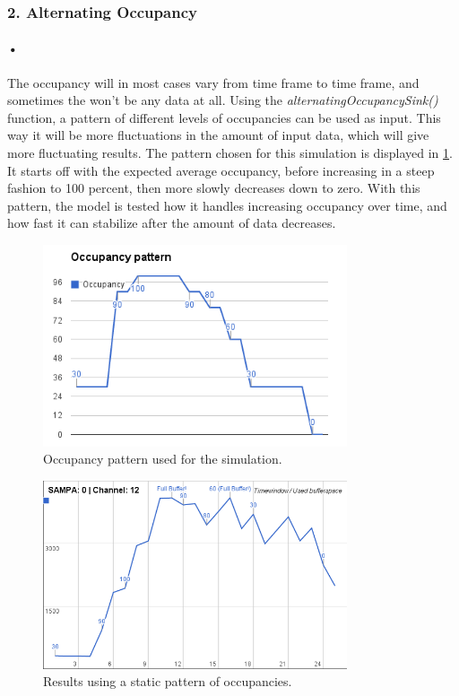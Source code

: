 \documentclass[a4paper, 12pt]{report}\dfrac{\right }{•}
\begin{document}
\subsubsection{2. Alternating Occupancy}

\paragraph{•} %
The occupancy will in most cases vary from time frame to time frame, and sometimes the won't be any data at all.
Using the \textit{alternatingOccupancySink()} function, a pattern of different levels of occupancies can be used as input.
This way it will be more fluctuations in the amount of input data, which will give more fluctuating results.
The pattern chosen for this simulation is displayed in \ref{fig:occ-pattern}.
It starts off with the expected average occupancy, before increasing in a steep fashion to 100 percent, then more slowly decreases down to zero.
With this pattern, the model is tested how it handles increasing occupancy over time, and how fast it can stabilize after the amount of data decreases.

\begin{figure}[h!]
	\centering
		\includegraphics[width=0.8\textwidth]{images/occ-pattern.png}
		\caption{Occupancy pattern used for the simulation.}
		\label{fig:occ-pattern}
\end{figure}

\begin{figure}[h!]
	\centering
		\includegraphics[width=0.8\textwidth]{images/results-alternating.png}
		\caption{Results using a static pattern of occupancies.}
		\label{fig:results-alternating}
\end{figure}
\end{document}
